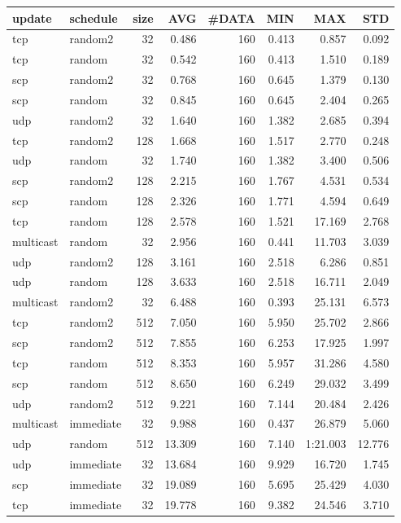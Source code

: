 \begin{tabular}{|llrrrrrr|}
\hline
{\sc update}&{\sc schedule}&{\sc size}&{\sc AVG}&{\sc\#DATA}&{\sc MIN}&{\sc MAX}&{\sc STD}\\
\hline
tcp & random2 & 32 &  0.486 & 160 & 0.413 & 0.857 & 0.092\\
tcp & random & 32 &  0.542 & 160 & 0.413 & 1.510 & 0.189\\
scp & random2 & 32 &  0.768 & 160 & 0.645 & 1.379 & 0.130\\
scp & random & 32 &  0.845 & 160 & 0.645 & 2.404 & 0.265\\
udp & random2 & 32 &  1.640 & 160 & 1.382 & 2.685 & 0.394\\
tcp & random2 & 128 &  1.668 & 160 & 1.517 & 2.770 & 0.248\\
udp & random & 32 &  1.740 & 160 & 1.382 & 3.400 & 0.506\\
scp & random2 & 128 &  2.215 & 160 & 1.767 & 4.531 & 0.534\\
scp & random & 128 &  2.326 & 160 & 1.771 & 4.594 & 0.649\\
tcp & random & 128 &  2.578 & 160 & 1.521 & 17.169 & 2.768\\
multicast & random & 32 &  2.956 & 160 & 0.441 & 11.703 & 3.039\\
udp & random2 & 128 &  3.161 & 160 & 2.518 & 6.286 & 0.851\\
udp & random & 128 &  3.633 & 160 & 2.518 & 16.711 & 2.049\\
multicast & random2 & 32 &  6.488 & 160 & 0.393 & 25.131 & 6.573\\
tcp & random2 & 512 &  7.050 & 160 & 5.950 & 25.702 & 2.866\\
scp & random2 & 512 &  7.855 & 160 & 6.253 & 17.925 & 1.997\\
tcp & random & 512 &  8.353 & 160 & 5.957 & 31.286 & 4.580\\
scp & random & 512 &  8.650 & 160 & 6.249 & 29.032 & 3.499\\
udp & random2 & 512 &  9.221 & 160 & 7.144 & 20.484 & 2.426\\
multicast & immediate & 32 &  9.988 & 160 & 0.437 & 26.879 & 5.060\\
udp & random & 512 &  13.309 & 160 & 7.140 & 1:21.003 & 12.776\\
udp & immediate & 32 &  13.684 & 160 & 9.929 & 16.720 & 1.745\\
scp & immediate & 32 &  19.089 & 160 & 5.695 & 25.429 & 4.030\\
tcp & immediate & 32 &  19.778 & 160 & 9.382 & 24.546 & 3.710\\

\end{tabular}
